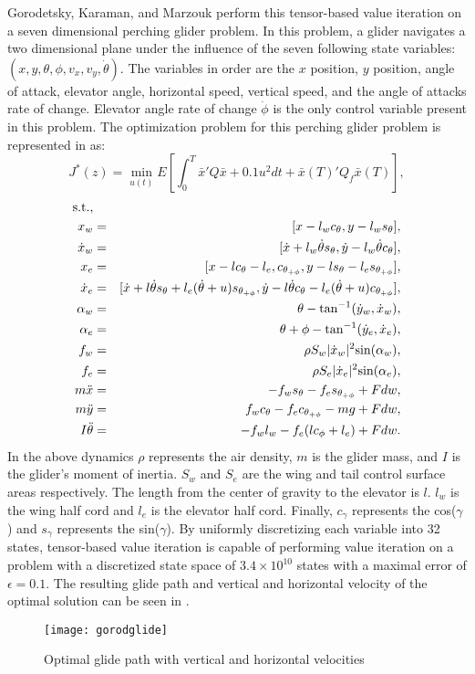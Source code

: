 Gorodetsky, Karaman, and Marzouk perform this tensor-based value iteration on a seven dimensional perching glider problem. In this problem, a glider navigates a two dimensional plane under the influence of the seven following state variables: $(x,y,\theta,\phi,v_x,v_y,\dot{\theta})$. The variables in order are the $x$ position, $y$ position, angle of attack, elevator angle, horizontal speed, vertical speed, and the angle of attacks rate of change. Elevator angle rate of change $\dot{\phi}$ is the only control variable present in this problem. The optimization problem for this perching glider problem is represented in \cite{Gorod} as:
\begin{equation}\label{eqn9}
J^*(z)= \underset{u(t) }{\operatorname{min }}E[\int_{0}^{T}\bar{x}'Q\bar{x}+ 0.1u^2dt + \bar{x}(T)'Q_f\bar{x}(T) ],
\end{equation}
\begin{eqnarray*}
\textnormal{s.t.,} &&\\
x_w & = & [x-l_w c_{\theta},y-l_w s_\theta],\\
\dot{x}_w & = & [\dot{x}+l_w \dot{\theta}s_\theta,\dot{y}-l_w \dot{\theta} c_\theta],\\
x_e & = & [x-lc_{\theta}-l_e,c_{\theta_{+\phi}},y-ls_\theta - l_e s_{\theta_{+\phi}}],\\
\dot{x}_e & = & [\dot{x}+l\dot{\theta}s_{\theta}+l_e(\dot{\theta}+u)s_{\theta_{+\phi}},\dot{y}-l\dot{\theta}c_\theta - l_e (\dot{\theta}+u) c_{\theta_{+\phi}}],\\
\alpha_w &=& \theta - \textnormal{tan}^{-1}(\dot{y}_w,\dot{x}_w), \\
\alpha_e &=& \theta + \phi -  \textnormal{tan}^{-1}(\dot{y}_e,\dot{x}_e), \\
f_w &=& \rho S_w |\dot{x}_w|^2 \textnormal{sin}(\alpha_w), \\
f_e &=& \rho S_e |\dot{x}_e|^2 \textnormal{sin}(\alpha_e), \\
m\ddot{x} &=& -f_w s_\theta - f_e s_{\theta_{+\phi}}+ Fdw, \\
m\ddot{y} &=& f_w c_\theta - f_e c_{\theta_{+\phi}}-mg+ Fdw, \\
I\ddot{\theta} &=& -f_w l_w - f_e(lc_\phi +l_e) + Fdw.
\end{eqnarray*}
In the above dynamics $\rho$ represents the air density, $m$ is the glider mass, and $I$ is the glider's moment of inertia. $S_w$ and $S_e$ are the wing and tail control surface areas respectively. The length from the center of gravity to the elevator is $l$. $l_w$ is the wing half cord and $l_e$ is the elevator half cord. Finally, $c_\gamma$ represents the cos($\gamma$) and $s_\gamma$ represents the sin($\gamma$). By uniformly discretizing each variable into 32 states, tensor-based value iteration is capable of performing value iteration on a problem with a discretized state space of $ 3.4 \times 10^{10}$ states with a maximal error of $ \epsilon = 0.1$. The resulting glide path and vertical and horizontal velocity of the optimal solution can be seen in .
\begin{figure}
\centering
\texttt{[image: gorodglide]}
\caption{Optimal glide path with vertical and horizontal velocities \cite{Gorod}}
\label{gorodglide}
\end{figure}

